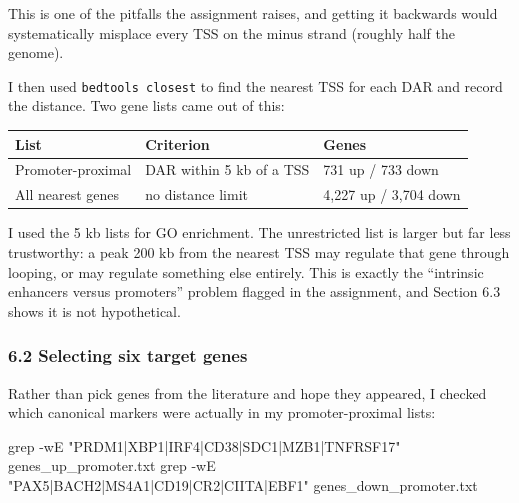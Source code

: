 \documentclass[
  11pt,
  a4paper,
]{article}
\newenvironment{Shaded}{}{}
\newcommand{\AttributeTok}[1]{\textcolor[rgb]{0.49,0.56,0.16}{#1}}
\newcommand{\ErrorTok}[1]{\textcolor[rgb]{1.00,0.00,0.00}{\textbf{#1}}}
\newcommand{\ExtensionTok}[1]{#1}
\newcommand{\FunctionTok}[1]{\textcolor[rgb]{0.02,0.16,0.49}{#1}}
\newcommand{\KeywordTok}[1]{\textcolor[rgb]{0.00,0.44,0.13}{\textbf{#1}}}
\newcommand{\NormalTok}[1]{#1}
\newcommand{\StringTok}[1]{\textcolor[rgb]{0.25,0.44,0.63}{#1}}
\newcommand{\VariableTok}[1]{\textcolor[rgb]{0.10,0.09,0.49}{#1}}
\begin{document}
\begin{Shaded}
\end{Shaded}

This is one of the pitfalls the assignment raises, and getting it
backwards would systematically misplace every TSS on the minus strand
(roughly half the genome).

I then used \texttt{bedtools\ closest} to find the nearest TSS for each
DAR and record the distance. Two gene lists came out of this:

\begin{longtable}[]{@{}lll@{}}
\toprule\noalign{}
List & Criterion & Genes \\
\midrule\noalign{}
\endhead
\bottomrule\noalign{}
\endlastfoot
Promoter-proximal & DAR within 5 kb of a TSS & 731 up / 733 down \\
All nearest genes & no distance limit & 4,227 up / 3,704 down \\
\end{longtable}

I used the 5 kb lists for GO enrichment. The unrestricted list is larger
but far less trustworthy: a peak 200 kb from the nearest TSS may
regulate that gene through looping, or may regulate something else
entirely. This is exactly the ``intrinsic enhancers versus promoters''
problem flagged in the assignment, and Section 6.3 shows it is not
hypothetical.

\hypertarget{selecting-six-target-genes}{%
\subsubsection{6.2 Selecting six target
genes}\label{selecting-six-target-genes}}

Rather than pick genes from the literature and hope they appeared, I
checked which canonical markers were actually in my promoter-proximal
lists:

\begin{Shaded}
\begin{Highlighting}[]
\FunctionTok{grep} \AttributeTok{{-}wE} \StringTok{"PRDM1|XBP1|IRF4|CD38|SDC1|MZB1|TNFRSF17"}\NormalTok{ genes\_up\_promoter.txt}
\FunctionTok{grep} \AttributeTok{{-}wE} \StringTok{"PAX5|BACH2|MS4A1|CD19|CR2|CIITA|EBF1"}\NormalTok{ genes\_down\_promoter.txt}
\end{Highlighting}
\end{Shaded}
\end{document}
